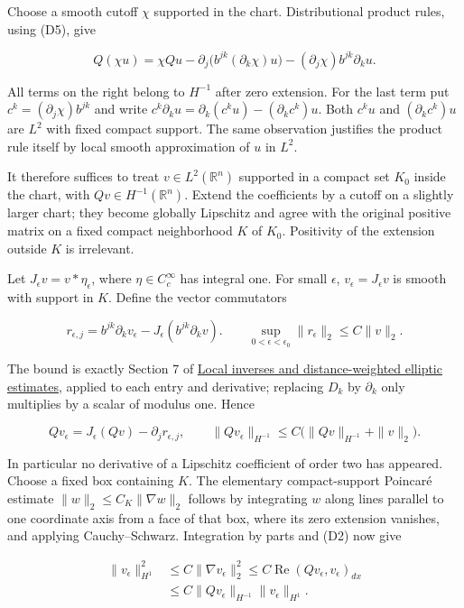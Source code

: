 \documentclass[
  11pt,
]{article}
\begin{document}
Choose a smooth cutoff \(\chi\) supported in the chart. Distributional
product rules, using (D5), give

\[
 Q(\chi u)=\chi Qu
 -\partial_j\bigl(b^{jk}(\partial_k\chi)u\bigr)
 -(\partial_j\chi)b^{jk}\partial_k u.                           \tag{D6}
\]

All terms on the right belong to \(H^{-1}\) after zero extension. For
the last term put \(c^k=(\partial_j\chi)b^{jk}\) and write
\(c^k\partial_k u=\partial_k(c^ku)-(\partial_kc^k)u\). Both \(c^ku\) and
\((\partial_kc^k)u\) are \(L^2\) with fixed compact support. The same
observation justifies the product rule itself by local smooth
approximation of \(u\) in \(L^2\).

It therefore suffices to treat \(v\in L^2(\mathbb R^n)\) supported in a
compact set \(K_0\) inside the chart, with
\(Qv\in H^{-1}(\mathbb R^n)\). Extend the coefficients by a cutoff on a
slightly larger chart; they become globally Lipschitz and agree with the
original positive matrix on a fixed compact neighborhood \(K\) of
\(K_0\). Positivity of the extension outside \(K\) is irrelevant.

Let \(J_\epsilon v=v*\eta_\epsilon\), where \(\eta\in C_c^\infty\) has
integral one. For small \(\epsilon\), \(v_\epsilon=J_\epsilon v\) is
smooth with support in \(K\). Define the vector commutators

\[
 r_{\epsilon,j}=b^{jk}\partial_kv_\epsilon
                  -J_\epsilon(b^{jk}\partial_kv).
 \qquad
 \sup_{0<\epsilon<\epsilon_0}\|r_\epsilon\|_2\leq C\|v\|_2.     \tag{D7}
\]

The bound is exactly Section 7 of
\href{local-elliptic-coefficients.pdf}{Local inverses and
distance-weighted elliptic estimates}, applied to each entry and
derivative; replacing \(D_k\) by \(\partial_k\) only multiplies by a
scalar of modulus one. Hence

\[
 Qv_\epsilon=J_\epsilon(Qv)-\partial_jr_{\epsilon,j},
 \qquad
 \|Qv_\epsilon\|_{H^{-1}}
       \leq C\bigl(\|Qv\|_{H^{-1}}+\|v\|_2\bigr).               \tag{D8}
\]

In particular no derivative of a Lipschitz coefficient of order two has
appeared. Choose a fixed box containing \(K\). The elementary
compact-support Poincaré estimate \(\|w\|_2\leq C_K\|\nabla w\|_2\)
follows by integrating \(w\) along lines parallel to one coordinate axis
from a face of that box, where its zero extension vanishes, and applying
Cauchy--Schwarz. Integration by parts and (D2) now give

\[
 \begin{split}
 \|v_\epsilon\|_{H^1}^2
 &\leq C\|\nabla v_\epsilon\|_2^2
 \leq C\operatorname{Re}(Qv_\epsilon,v_\epsilon)_{dx}\\
 &\leq C\|Qv_\epsilon\|_{H^{-1}}\|v_\epsilon\|_{H^1}.
 \end{split}                                                     \tag{D9}
\]
\end{document}
